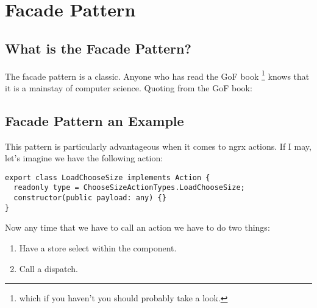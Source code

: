 \maketitle{}
\section{ Facade Pattern }

\subsection{ What is the Facade Pattern? }
The facade pattern is a classic. Anyone who has read the GoF book \footnote{
which if you haven't you should probably take a look.} knows that it is a
mainstay of computer science. Quoting from the GoF book:


\subsection{ Facade Pattern an Example }
This pattern is particularly advantageous when it comes to ngrx actions. If I
may, let's imagine we have the following action:

\begin{lstlisting}
export class LoadChooseSize implements Action {
  readonly type = ChooseSizeActionTypes.LoadChooseSize;
  constructor(public payload: any) {}
}
\end{lstlisting}

Now any time that we have to call an action we have to do two things:
\begin{enumerate}
  \item Have a store select within the component.
  \item Call a dispatch.
\end{enumerate}
